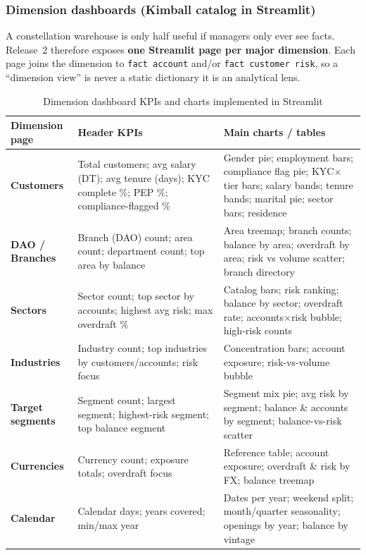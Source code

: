 \subsubsection*{Dimension dashboards (Kimball catalog in Streamlit)}
A constellation warehouse is only half useful if managers only ever see facts.
Release~2 therefore exposes \textbf{one Streamlit page per major dimension}.
Each page joins the dimension to \texttt{fact account} and/or
\texttt{fact customer risk}, so a ``dimension view'' is never a static
dictionary it is an analytical lens.

\begin{table}[H]
\centering
\caption{Dimension dashboard KPIs and charts implemented in Streamlit}
\label{tab:dim_dashboard_kpis}
\renewcommand{\arraystretch}{1.2}
\scriptsize
\begin{tabular}{|p{2.8cm}|p{5.0cm}|p{6.4cm}|}
\hline
\rowcolor{blue!15}
\textbf{Dimension page} & \textbf{Header KPIs} & \textbf{Main charts / tables} \\
\hline
\textbf{Customers} & Total customers; avg salary (DT); avg tenure (days); KYC complete \%; PEP \%; compliance-flagged \% & Gender pie; employment bars; compliance flag pie; KYC$\times$tier bars; salary bands; tenure bands; marital pie; sector bars; residence \\
\hline
\textbf{DAO / Branches} & Branch (DAO) count; area count; department count; top area by balance & Area treemap; branch counts; balance by area; overdraft by area; risk vs volume scatter; branch directory \\
\hline
\textbf{Sectors} & Sector count; top sector by accounts; highest avg risk; max overdraft \% & Catalog bars; risk ranking; balance by sector; overdraft rate; accounts$\times$risk bubble; high-risk counts \\
\hline
\textbf{Industries} & Industry count; top industries by customers/accounts; risk focus & Concentration bars; account exposure; risk-vs-volume bubble \\
\hline
\textbf{Target segments} & Segment count; largest segment; highest-risk segment; top balance segment & Segment mix pie; avg risk by segment; balance \& accounts by segment; balance-vs-risk scatter \\
\hline
\textbf{Currencies} & Currency count; exposure totals; overdraft focus & Reference table; account exposure; overdraft \& risk by FX; balance treemap \\
\hline
\textbf{Calendar} & Calendar days; years covered; min/max year & Dates per year; weekend split; month/quarter seasonality; openings by year; balance by vintage \\
\hline
\end{tabular}
\end{table}

